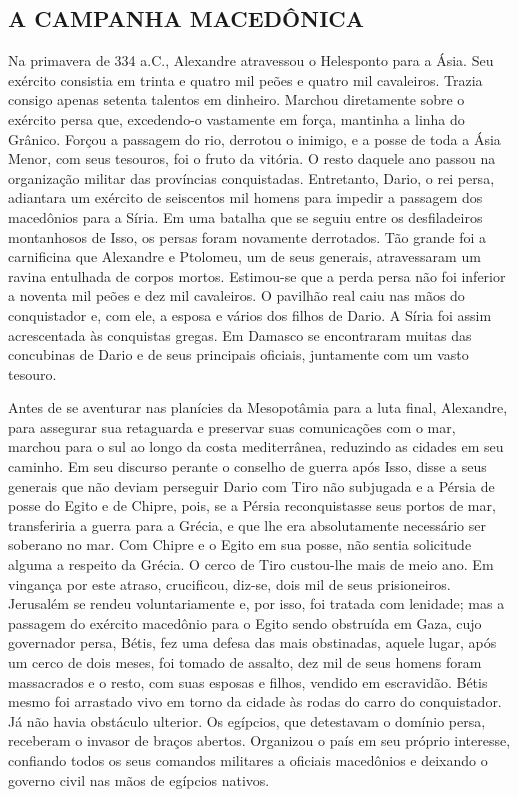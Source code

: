 \documentclass[11pt,a5paper,twoside,openany]{book}
\begin{document}
\subsection*{A CAMPANHA MACEDÔNICA}
Na primavera de 334 a.C., Alexandre atravessou o Helesponto para a Ásia. Seu exército consistia em trinta e quatro mil peões e quatro mil cavaleiros. Trazia consigo apenas setenta talentos em dinheiro. Marchou diretamente sobre o exército persa que, excedendo-o vastamente em força, mantinha a linha do Grânico. Forçou a passagem do rio, derrotou o inimigo, e a posse de toda a Ásia Menor, com seus tesouros, foi o fruto da vitória. O resto daquele ano passou na organização militar das províncias conquistadas. Entretanto, Dario, o rei persa, adiantara um exército de seiscentos mil homens para impedir a passagem dos macedônios para a Síria. Em uma batalha que se seguiu entre os desfiladeiros montanhosos de Isso, os persas foram novamente derrotados. Tão grande foi a carnificina que Alexandre e Ptolomeu, um de seus generais, atravessaram um ravina entulhada de corpos mortos. Estimou-se que a perda persa não foi inferior a noventa mil peões e dez mil cavaleiros. O pavilhão real caiu nas mãos do conquistador e, com ele, a esposa e vários dos filhos de Dario. A Síria foi assim acrescentada às conquistas gregas. Em Damasco se encontraram muitas das concubinas de Dario e de seus principais oficiais, juntamente com um vasto tesouro.

Antes de se aventurar nas planícies da Mesopotâmia para a luta final, Alexandre, para assegurar sua retaguarda e preservar suas comunicações com o mar, marchou para o sul ao longo da costa mediterrânea, reduzindo as cidades em seu caminho. Em seu discurso perante o conselho de guerra após Isso, disse a seus generais que não deviam perseguir Dario com Tiro não subjugada e a Pérsia de posse do Egito e de Chipre, pois, se a Pérsia reconquistasse seus portos de mar, transferiria a guerra para a Grécia, e que lhe era absolutamente necessário ser soberano no mar. Com Chipre e o Egito em sua posse, não sentia solicitude alguma a respeito da Grécia. O cerco de Tiro custou-lhe mais de meio ano. Em vingança por este atraso, crucificou, diz-se, dois mil de seus prisioneiros. Jerusalém se rendeu voluntariamente e, por isso, foi tratada com lenidade; mas a passagem do exército macedônio para o Egito sendo obstruída em Gaza, cujo governador persa, Bétis, fez uma defesa das mais obstinadas, aquele lugar, após um cerco de dois meses, foi tomado de assalto, dez mil de seus homens foram massacrados e o resto, com suas esposas e filhos, vendido em escravidão. Bétis mesmo foi arrastado vivo em torno da cidade às rodas do carro do conquistador. Já não havia obstáculo ulterior. Os egípcios, que detestavam o domínio persa, receberam o invasor de braços abertos. Organizou o país em seu próprio interesse, confiando todos os seus comandos militares a oficiais macedônios e deixando o governo civil nas mãos de egípcios nativos.
\end{document}
